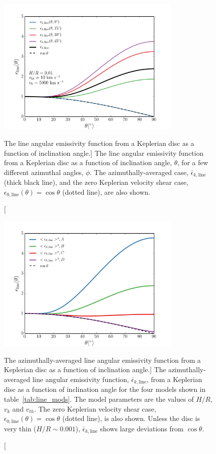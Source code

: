 \begin{figure}
\centering
\includegraphics[width=0.8\textwidth]{figures/ewpaper/line_azi.png}
\caption
[The line angular emissivity function from a Keplerian disc 
as a function of inclination angle.]
{
The line angular emissivity function from a Keplerian disc 
as a function of inclination angle, $\theta$, for a few different azimuthal angles, $\phi$.
The azimuthally-averaged case, $\bar{\epsilon}_{k,\mathrm{line}}$ (thick black line),
and the zero Keplerian velocity shear case, 
$\epsilon_{0,\mathrm{line}}(\theta) = \cos \theta$ (dotted line), are also shown.
}
\label{fig:line_aniso1}
\end{figure}


\begin{figure}
\centering
\includegraphics[width=0.8\textwidth]{figures/ewpaper/line_emiss.png}
\caption
[The azimuthally-averaged line angular emissivity function from a Keplerian disc 
as a function of inclination angle.]
{
The azimuthally-averaged line angular emissivity function, $\bar{\epsilon}_{k,\mathrm{line}}$,
from a Keplerian disc as a function of inclination angle for the four models shown in 
table~\ref{tab:line_mods}. The model parameters are the values of $H/R$, $v_k$ and $v_{th}$. 
The zero Keplerian velocity shear case, $\epsilon_{0,\mathrm{line}}(\theta) = \cos \theta$ (dotted line), 
is also shown. Unless the disc is very thin ($H/R\sim0.001$),
$\bar{\epsilon}_{k,\mathrm{line}}$ shows large deviations from $\cos \theta$.
}
\label{fig:line_aniso2}
\end{figure}

